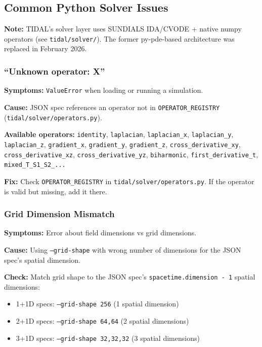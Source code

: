\subsection{Common Python Solver Issues}
\label{sec:python-solver-issues}

\textbf{Note:} TIDAL's solver layer uses SUNDIALS IDA/CVODE + native numpy operators (see \texttt{tidal/solver/}). The former py-pde-based architecture was replaced in February 2026.

\subsubsection{``Unknown operator: X''}

\textbf{Symptoms:} \texttt{ValueError} when loading or running a simulation.

\textbf{Cause:} JSON spec references an operator not in \texttt{OPERATOR\_REGISTRY} (\texttt{tidal/solver/operators.py}).

\textbf{Available operators:} \texttt{identity}, \texttt{laplacian}, \texttt{laplacian\_x}, \texttt{laplacian\_y}, \texttt{laplacian\_z}, \texttt{gradient\_x}, \texttt{gradient\_y}, \texttt{gradient\_z}, \texttt{cross\_derivative\_xy}, \texttt{cross\_derivative\_xz}, \texttt{cross\_derivative\_yz}, \texttt{biharmonic}, \texttt{first\_derivative\_t}, \texttt{mixed\_T\_S1\_S2\_...}

\textbf{Fix:} Check \texttt{OPERATOR\_REGISTRY} in \texttt{tidal/solver/operators.py}. If the operator is valid but missing, add it there.

\subsubsection{Grid Dimension Mismatch}

\textbf{Symptoms:} Error about field dimensions vs grid dimensions.

\textbf{Cause:} Using \texttt{--grid-shape} with wrong number of dimensions for the JSON spec's spatial dimension.

\textbf{Check:} Match grid shape to the JSON spec's \texttt{spacetime.dimension - 1} spatial dimensions:

\begin{itemize}
  \item 1+1D specs: \texttt{--grid-shape 256} (1 spatial dimension)
  \item 2+1D specs: \texttt{--grid-shape 64,64} (2 spatial dimensions)
  \item 3+1D specs: \texttt{--grid-shape 32,32,32} (3 spatial dimensions)
\end{itemize}

